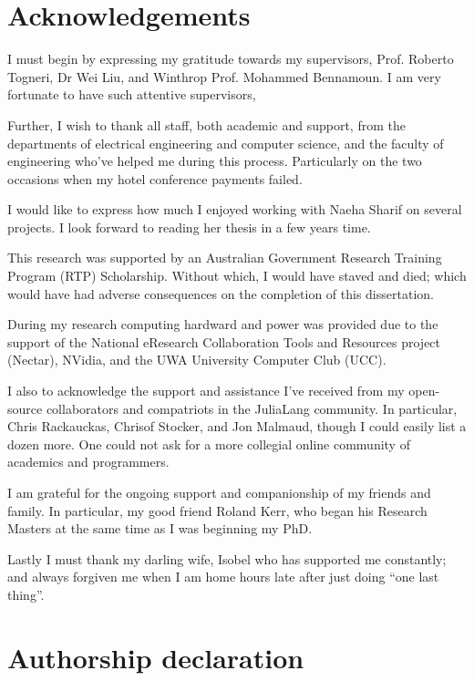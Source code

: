 \documentclass{book}
\begin{document}
\chapter*{Acknowledgements}

I must begin by expressing my gratitude towards my supervisors,
Prof. Roberto Togneri, Dr Wei Liu, and Winthrop Prof. Mohammed Bennamoun.
I am very fortunate to have such attentive supervisors,


Further, I wish to thank all staff, both academic and support, from the departments of electrical engineering and computer science, and the faculty of engineering who've helped me during this process.
Particularly on the two occasions when my hotel conference payments failed.


I would like to express how much I enjoyed working with Naeha Sharif on several projects.
I look forward to reading her thesis in a few years time.



This research was supported by an Australian Government Research Training Program (RTP) Scholarship.
Without which, I would have staved and died; which would have had adverse consequences on the completion of this dissertation.

During my research computing hardward and  power was provided due to the support of 
the National eResearch Collaboration Tools and Resources project (Nectar),
NVidia, and the UWA University Computer Club (UCC).

I also to acknowledge the support and assistance I've received from my open-source collaborators and compatriots in the JuliaLang community.
In particular, Chris Rackauckas, Chrisof Stocker, and Jon Malmaud, though I could easily list a dozen more.
One could not ask for a more collegial online community of academics and programmers.

I am grateful for the ongoing support and companionship of my friends and family.
In particular, my good friend Roland Kerr, who began his Research Masters at the same time as I was beginning my PhD.


Lastly I must thank my darling wife, Isobel who has supported me constantly;
and always forgiven me when I am home hours late after just doing ``one last thing''.


\chapter*{Authorship declaration}
\end{document}
